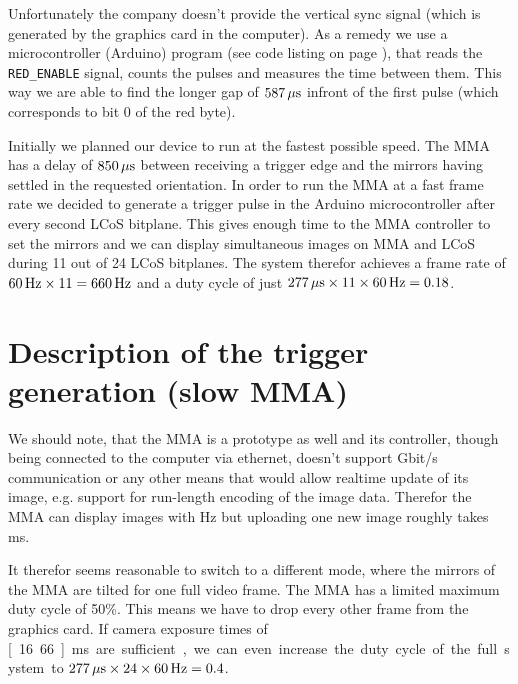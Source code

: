 Unfortunately the company doesn't provide the vertical sync signal
(which is generated by the graphics card in the computer). As a remedy
we use a microcontroller (Arduino) program (see code listing on page
\pageref{fig:arduino-vsync}), that reads the \verb!RED_ENABLE! signal,
counts the pulses and measures the time between them. This way we are
able to find the longer gap of $\unit[587]{\mu s}$ infront of the
first pulse (which corresponds to bit 0 of the red byte).


Initially we planned our device to run at the fastest possible
speed. The MMA has a delay of $\unit[850]{\mu s}$ between receiving a
trigger edge and the mirrors having settled in the requested
orientation. In order to run the MMA at a fast frame rate we decided
to generate a trigger pulse in the Arduino microcontroller after every
second LCoS bitplane. This gives enough time to the MMA controller to
set the mirrors and we can display simultaneous images on MMA and LCoS
during 11 out of 24 LCoS bitplanes. The system therefor achieves a
frame rate of $\unit[60]{Hz}\times11=\unit[660]{Hz}$ and a duty cycle
of just $\unit[277]{\mu s}\times11\times\unit[60]{Hz}=0.18$.

\section{Description of the trigger generation (slow MMA)}
We should note, that the MMA is a prototype as well and its
controller, though being connected to the computer via ethernet,
doesn't support \unit[1]{Gbit/s} communication or any other means that
would allow realtime update of its image, e.g. support for run-length
encoding of the image data. Therefor the MMA can display images with
\unit[660]{Hz} but uploading one new image roughly takes
\unit[80]{ms}.

It therefor seems reasonable to switch to a different mode, where the
mirrors of the MMA are tilted for one full video frame. The MMA has a
limited maximum duty cycle of 50\%. This means we have to drop every
other frame from the graphics card. If camera exposure times of
\unit[16.66]{ms} are sufficient, we can even increase the duty cycle
of the full system to $\unit[277]{\mu
  s}\times24\times\unit[60]{Hz}=0.4$.


